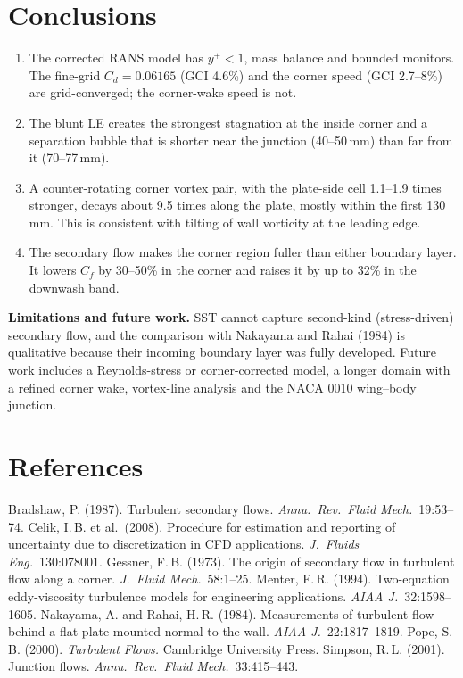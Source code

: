 \documentclass[11pt,a4paper]{article}
\newcommand{\Cd}{C_d}
\newcommand{\Cf}{C_f}
\begin{document}
\section{Conclusions}
\begin{enumerate}\setlength{\itemsep}{1pt}
\item The corrected RANS model has $y^+<1$, mass balance and bounded monitors. The fine-grid $\Cd=0.06165$ (GCI 4.6\%) and the corner speed (GCI 2.7--8\%) are grid-converged; the corner-wake speed is not.
\item The blunt LE creates the strongest stagnation at the inside corner and a separation bubble that is shorter near the junction (40--50\,mm) than far from it (70--77\,mm).
\item A counter-rotating corner vortex pair, with the plate-side cell 1.1--1.9 times stronger, decays about 9.5 times along the plate, mostly within the first 130\,mm. This is consistent with tilting of wall vorticity at the leading edge.
\item The secondary flow makes the corner region fuller than either boundary layer. It lowers $\Cf$ by 30--50\% in the corner and raises it by up to 32\% in the downwash band.
\end{enumerate}
\textbf{Limitations and future work.} SST cannot capture second-kind (stress-driven) secondary flow, and the comparison with Nakayama and Rahai (1984) is qualitative because their incoming boundary layer was fully developed. Future work includes a Reynolds-stress or corner-corrected model, a longer domain with a refined corner wake, vortex-line analysis and the NACA 0010 wing--body junction.

{\footnotesize
\section*{References}
\setlength{\parskip}{0pt}
Bradshaw, P. (1987). Turbulent secondary flows. \emph{Annu.\ Rev.\ Fluid Mech.}\ 19:53--74. \quad
Celik, I.\,B. et al.\ (2008). Procedure for estimation and reporting of uncertainty due to discretization in CFD applications. \emph{J.\ Fluids Eng.}\ 130:078001. \quad
Gessner, F.\,B. (1973). The origin of secondary flow in turbulent flow along a corner. \emph{J.\ Fluid Mech.}\ 58:1--25. \quad
Menter, F.\,R. (1994). Two-equation eddy-viscosity turbulence models for engineering applications. \emph{AIAA J.}\ 32:1598--1605. \quad
Nakayama, A. and Rahai, H.\,R. (1984). Measurements of turbulent flow behind a flat plate mounted normal to the wall. \emph{AIAA J.}\ 22:1817--1819. \quad
Pope, S.\,B. (2000). \emph{Turbulent Flows.} Cambridge University Press. \quad
Simpson, R.\,L. (2001). Junction flows. \emph{Annu.\ Rev.\ Fluid Mech.}\ 33:415--443.
\par}
\end{document}
